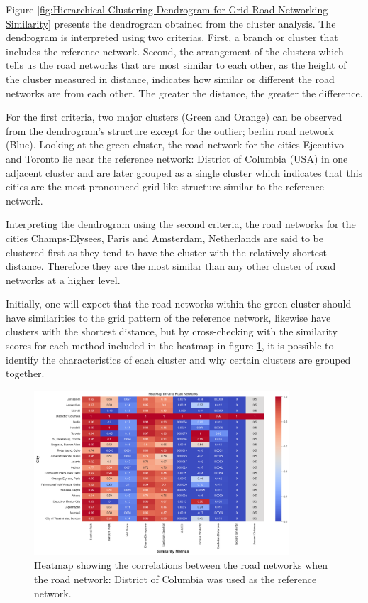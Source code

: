 Figure \ref{fig:Hierarchical Clustering Dendrogram for Grid Road Networking Similarity} presents the dendrogram obtained from the cluster analysis. The dendrogram  is interpreted using two criterias. First, a branch or cluster that includes the reference network. Second, the arrangement of the clusters which tells us the road networks that are most similar to each other, as the height of the cluster measured in distance, indicates how similar or different the road networks are from each other. The greater the distance, the greater the difference. 

For the first criteria, two major clusters (Green and Orange) can be observed from the dendrogram's structure except for the outlier; berlin road network (Blue). Looking at the green cluster, the road network for the cities Ejecutivo and Toronto lie near the reference network: District of Columbia (USA) in one adjacent cluster and are later grouped as a single cluster which indicates that this cities are the most pronounced grid-like structure similar to the reference network. 

Interpreting the dendrogram using the second criteria, the road networks for the cities Champs-Elysees, Paris and Amsterdam, Netherlands are said to be clustered first as they tend to have the cluster with the relatively shortest distance. Therefore they are the most similar than any other cluster of road networks at a higher level.

Initially, one will expect that the road networks within the green cluster should have similarities to the grid pattern of the reference network, likewise have clusters with the shortest distance, but by cross-checking with the similarity scores for each method included in the heatmap in figure \ref{fig:Heatmap showing the correlations for Grid Road Networks}, it is possible to identify the characteristics of each cluster and why certain clusters are grouped together.

\begin{figure}[!ht]
\centering
\includegraphics[width=0.85\textwidth,center]{picture/Grid/gridheatmap.png}
\caption[Heatmap showing the correlations for Grid Road Networks]{Heatmap showing the correlations between the road networks when the road network: District of Columbia was used as the reference network.}
\label{fig:Heatmap showing the correlations for Grid Road Networks}
\end{figure}



